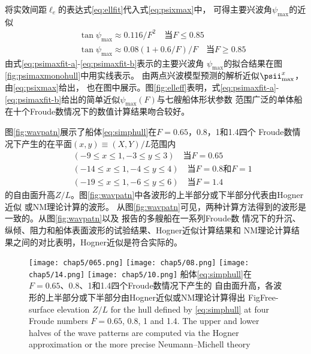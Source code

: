 将实效间距$\ell_e$的表达式\eqref{eq:ellfit}代入式\eqref{eq:psixmax}中，
可得主要兴波角$\psi_{\max}$的近似
\begin{subequations}
  \label{eq:psimaxfit}
  \begin{eqnarray}
    &&\tan\psi_{\max}\approx 0.116/F^2\quad\text{当}F\le0.85
    \label{eq:psimaxfit-a}\\
    &&\tan\psi_{\max}\approx 0.08(1+0.6/F)/F\quad\text{当}F\ge0.85
    \label{eq:psimaxfit-b}
  \end{eqnarray}
\end{subequations}
由式\eqref{eq:psimaxfit-a}-\eqref{eq:psimaxfit-b}表示的主要兴波角
$\psi_{\max}$的拟合结果在图\ref{fig:psimaxmonohull}中用实线表示。
由两点兴波模型预测的解析近似$\psii^x_{\max}$，由\eqref{eq:psixmax}给出，
也在图中展示。图\ref{fig:elleff}表明，式\eqref{eq:psimaxfit-a}-
\eqref{eq:psimaxfit-b}给出的简单近似$\psi_{\max}(F)$与七艘船体形状参数
范围广泛的单体船在十个Froude数情况下的数值计算结果吻合较好。

图\ref{fig:wavpatn}展示了船体\eqref{eq:simphull}在$F=0.65$，0.8，1和1.4四个
Froude数情况下产生的在平面$(x,y)\equiv(X,Y)/L$范围内
\begin{eqnarray*}
  &&(-9\le x\le 1,-3\le y\le3)\quad\text{当}F=0.65\\
  &&(-14\le x\le1,-4\le y\le4)\quad\text{当}F=0.8\text{和}F=1\\
  &&(-19\le x\le1,-6\le y\le6)\quad\text{当}F=1.4
\end{eqnarray*}
的自由面升高$Z/L$。图\ref{fig:wavpatn}中各波形的上半部分或下半部分代表由Hogner近似
\supercite{Hogner1932Hydromech}或NM理论\supercite{Noblesse2014Why}计算的波形。
从图\ref{fig:wavpatn}可见，两种计算方法得到的波形是一致的。从图\ref{fig:wavpatn}以及
\parencite{Noblesse2013Neumann,Huang2013Numerical}报告的多艘船在一系列Froude数
情况下的升沉、纵倾、阻力和船体表面波形的试验结果、Hogner近似计算结果和
NM理论计算结果之间的对比表明，Hogner近似是符合实际的。
%
\begin{figure}[htp]
  \centering
  \captionstyle{\centering}
  \texttt{[image: chap5/065.png]}
  \texttt{[image: chap5/08.png]}
  \texttt{[image: chap5/14.png]}
  \texttt{[image: chap5/10.png]}
  {船体\eqref{eq:simphull}在$F=0.65$、0.8、1和1.4四个Froude数情况下产生的
自由面升高，各波形的上半部分或下半部分由Hogner近似或NM理论计算得出}
{Fig}{Free-surface elevation $Z/L$ for the hull defined by \eqref{eq:simphull} 
at four Froude numbers $F = 0.65$, 0.8, 1 and 1.4. The upper and lower halves 
of the wave patterns are computed via the Hogner approximation or the 
more precise Neumann–Michell theory}
\end{figure}

